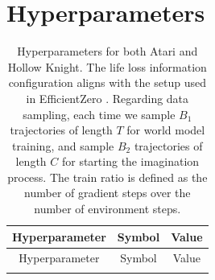 \section{Hyperparameters}
\begin{longtable}{ccc}
    \caption{
        Hyperparameters for both Atari and Hollow Knight.
        The life loss information configuration aligns with the setup used in EfficientZero \citep{ye_mastering_2021}.
        Regarding data sampling, each time we sample $B_1$ trajectories of length $T$ for world model training, and sample $B_2$ trajectories of length $C$ for starting the imagination process.
        The train ratio is defined as the number of gradient steps over the number of environment steps.
    }\\
    \toprule
    Hyperparameter & Symbol & Value\\
    \midrule
    \endfirsthead

    \toprule
    Hyperparameter & Symbol & Value\\
    \midrule
    \endhead

    \bottomrule
    \endfoot

    \bottomrule
    \endlastfoot


\end{longtable}
